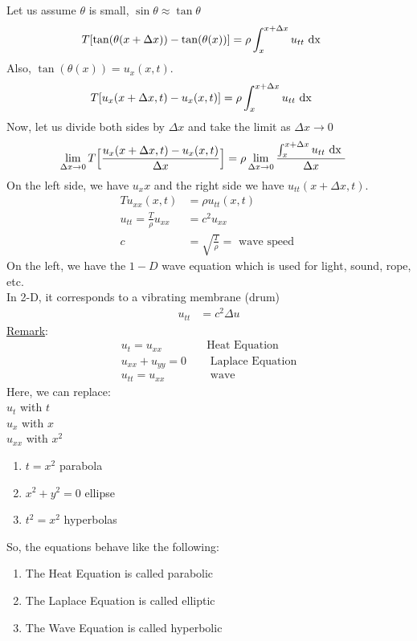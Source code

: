 \documentclass{article}
\begin{document}
Let us assume $\theta$ is small, $\sin \theta \approx \tan \theta$
\begin{align}
  T[\tan(\theta(x + \Delta x)) - \tan(\theta(x))] & = \rho \int^{x + \Delta x}_x u_{tt} \text{ dx }
\end{align}
Also, $\tan(\theta(x)) = u_x(x, t)$.
\begin{align}
  T[u_x(x + \Delta x, t) - u_x(x, t)] & =
  \rho \int^{x + \Delta x}_x u_{tt} \text{ dx }
\end{align}
Now, let us divide both sides by $\Delta x$ and take the limit as $\Delta x \rightarrow 0$
\begin{align}
  \lim_{\Delta x \rightarrow 0} T\Big[\frac{u_x(x + \Delta x, t) - u_x(x, t)}{\Delta x}\Big] & =
  \rho \lim_{\Delta x \rightarrow 0} \frac{\int^{x + \Delta x}_x u_{tt} \text{ dx }}{\Delta x}
\end{align}
On the left side, we have $u_xx$ and the right side we have $u_{tt}(x + \Delta x, t)$.
\begin{align}
  Tu_{xx}(x, t) & = \rho u_{tt}(x, t)\\
  u_{tt} = \frac{T}{\rho} u_{xx} & = c^2 u_{xx}\\
  c & = \sqrt{\frac{T}{\rho}} = \text{ wave speed }
\end{align}
On the left, we have the $1-D$ wave equation which is used for light, sound, rope, etc.\\
In 2-D, it corresponds to a vibrating membrane (drum)
\begin{align}
  u_{tt} & = c^2\Delta u
\end{align}
\underline{Remark}:
\begin{align}
  u_t = u_{xx} \quad & \text{Heat Equation}\\
  u_{xx} + u_{yy} = 0 \quad & \text{ Laplace Equation}\\
  u_{tt} = u_{xx} \quad & \text{ wave}
\end{align}
Here, we can replace:\\
$u_t$ with $t$\\
$u_x$ with $x$\\
$u_{xx}$ with $x^2$
\begin{enumerate}
  \item $t = x^2$ parabola
  \item $x^2 + y^2 = 0$ ellipse
  \item $t^2 = x^2$ hyperbolas
\end{enumerate}
So, the equations behave like the following:
\begin{enumerate}
  \item The Heat Equation is called parabolic
  \item The Laplace Equation is called elliptic
  \item The Wave Equation is called hyperbolic
\end{enumerate}
\newpage
\end{document}
